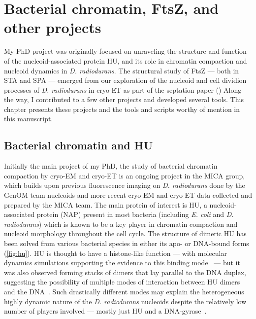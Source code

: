 \chapter{Bacterial chromatin, FtsZ, and other projects}\label{other_projects}

My PhD project was originally focused on unraveling the structure and function of the nucleoid-associated protein HU, and its role in chromatin compaction and nucleoid dynamics in \textit{D. radiodurans}.
The structural study of FtsZ --- both in STA and SPA --- emerged from our exploration of the nucleoid and cell dividion processes of \textit{D. radiodurans} in cryo-ET as part of the septation paper ()
Along the way, I contributed to a few other projects and developed several tools.
This chapter presents these projects and the tools and scripts worthy of mention in this manuscript.

\localtableofcontents

\section{Bacterial chromatin and HU}\label{hu}

Initially the main project of my PhD, the study of bacterial chromatin compaction by cryo-EM and cryo-ET is an ongoing project in the MICA group, which builds upon previous fluorescence imaging on \textit{D. radiodurans} done by the GenOM team nucleoids and more recent cryo-EM and cryo-ET data collected and prepared by the MICA team.
The main protein of interest is HU, a nucleoid-associated protein (NAP) present in most bacteria (including \textit{E. coli} and \textit{D. radiodurans}) which is known to be a key player in chromatin compaction and nucleoid morphology throughout the cell cycle.
The structure of dimeric HU has been solved from various bacterial species in either its apo- or DNA-bound forms (\autoref{fig:hu}).
HU is thought to have a histone-like function --- with molecular dynamics simulations supporting the evidence to this binding mode~\cite{hognonMolecularBasesDNA2019} --- but it was also observed forming stacks of dimers that lay parallel to the DNA duplex, suggesting the possibility of multiple modes of interaction between HU dimers and the DNA~\cite{hammelHUMultimerizationShift2016}.
Such drastically different modes may explain the heterogeneous highly dynamic nature of the \textit{D. radiodurans} nucleoids despite the relatively low number of players involved --- mostly just HU and a DNA-gyrase~\cite{TODO}.

